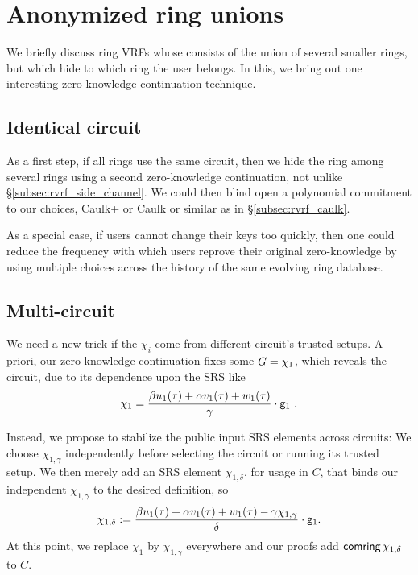 \section{Anonymized ring unions}%
\label{sec:ring_hiding}

We briefly discuss ring VRFs whose \ring consists of the union of several
smaller rings, but which hide to which ring the user belongs.  In this,
we bring out one interesting zero-knowledge continuation technique.


\subsection{Identical circuit}

As a first step, if all rings use the same circuit, then we hide the
ring among several rings using a second zero-knowledge continuation,
not unlike \S\ref{subsec:rvrf_side_channel}.
We could then blind open a polynomial commitment \cite{KZG} to our
\comring choices, Caulk+ \cite{caulk+} or Caulk \cite{caulk} or similar
as in \S\ref{subsec:rvrf_caulk}.

As a special case, if users cannot change their keys too quickly, then
one could reduce the frequency with which users reprove their original
zero-knowledge by using multiple \comring choices across the history
of the same evolving ring database.



\subsection{Multi-circuit}

We need a new trick if the $\chi_i$ come from different circuit's
trusted setups.  A priori, our zero-knowledge continuation \pifast
fixes some $G = \chi_1$, which reveals the circuit,
due to its dependence upon the SRS like
$$ \chi_1 = \frac{\beta u_1(\tau) + \alpha v_1(\tau) + w_1(\tau)}{\gamma} \cdot \gone \ \mathperiod $$

Instead, we propose to stabilize the public input SRS elements across circuits:
We choose $\chi_{1,\gamma}$ independently before selecting the circuit
or running its trusted setup.
We then merely add an SRS element $\chi_{1,\delta}$, for usage in $C$, that binds
our independent $\chi_{1,\gamma}$ to the desired definition, so
$$ \chi_{1,\delta} := \frac{\beta u_1(\tau) + \alpha v_1(\tau) + w_1(\tau) - \gamma \chi_{1,\gamma}}{\delta} \cdot \mathsf{g}_1 . $$
At this point, we replace $\chi_1$ by $\chi_{1,\gamma}$ everywhere and
our proofs add $\mathsf{comring} \, \chi_{1,\delta}$ to $C$.

